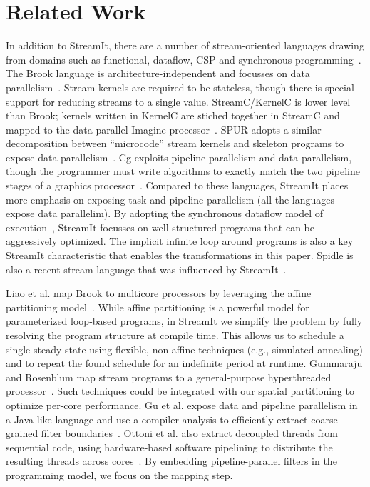 \section{Related Work}
\label{sec:related}


In addition to StreamIt, there are a number of stream-oriented
languages drawing from domains such as functional, dataflow, CSP and
synchronous programming~\cite{survey97}.  The Brook language is
architecture-independent and focusses on data
parallelism~\cite{brook04}.  Stream kernels are required to be
stateless, though there is special support for reducing streams to a
single value.  Stream\-C/Ker\-nel\-C is lower level than Brook;
kernels written in KernelC are stiched together in StreamC and mapped
to the data-parallel Imagine processor~\cite{imagine03ieee}.  SPUR
adopts a similar decomposition between ``microcode'' stream kernels
and skeleton programs to expose data parallelism~\cite{spur05samos}.
Cg exploits pipeline parallelism and data parallelism, though the
programmer must write algorithms to exactly match the two pipeline
stages of a graphics processor~\cite{cg03}.  Compared to these
languages, StreamIt places more emphasis on exposing task and pipeline
parallelism (all the languages expose data parallelim).
By adopting the synchronous dataflow model of execution~\cite{lee87},
StreamIt focusses on well-structured programs that can be aggressively
optimized.  The implicit infinite loop around programs is also a key
StreamIt characteristic that enables the transformations in this
paper.  Spidle is also a recent stream language that was influenced by
StreamIt~\cite{spidle03}.

Liao et al. map Brook to multicore processors by leveraging the affine
partitioning model~\cite{liao06brook}.  While affine partitioning is a
powerful model for parameterized loop-based programs, in StreamIt we
simplify the problem by fully resolving the program structure at
compile time.  This allows us to schedule a single steady state using
flexible, non-affine techniques (e.g., simulated annealing) and to
repeat the found schedule for an indefinite period at runtime.
Gummaraju and Rosenblum map stream programs to a general-purpose
hyperthreaded processor~\cite{gummaraju05micro}.  Such techniques
could be integrated with our spatial partitioning to optimize per-core
performance.  Gu et al. expose data and pipeline parallelism in a
Java-like language and use a compiler analysis to efficiently extract
coarse-grained filter boundaries~\cite{du03sc}.  Ottoni et al. also
extract decoupled threads from sequential code, using hardware-based
software pipelining to distribute the resulting threads across
cores~\cite{ottoni05decoupled}.  By embedding pipeline-parallel
filters in the programming model, we focus on the mapping step.


